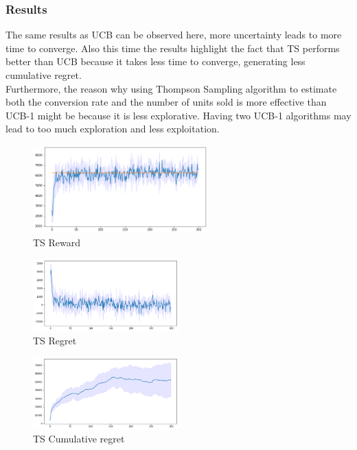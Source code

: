 \subsubsection{Results}
The same results as UCB can be observed here, more uncertainty leads to more time to converge. Also this time the results highlight the fact that TS performs better than UCB because it takes less time to converge, generating less cumulative regret.\\ Furthermore, the reason why using Thompson Sampling algorithm to estimate both the conversion rate and the number of units sold is more effective than UCB-1 might be because it is less explorative. Having two UCB-1 algorithms may lead to too much exploration and less exploitation.
\begin{figure}[ht]
    \begin{center}
    \includegraphics[width=0.6\textwidth]{img/TS4.png}
    \caption{TS Reward}
    \label{fig:reward42}
    \end{center}
\end{figure}
\begin{multicols}{2}
    \begin{figure}[H]
        \begin{center}
        \includegraphics[width=0.5\textwidth]{img/TS4_regret.png}
        \caption{TS Regret}
        \label{fig:regret42}
        \end{center}
    \end{figure}
    \columnbreak
    \begin{figure}[H]
        \begin{center}
        \includegraphics[width=0.5\textwidth]{img/TS4_cum_reg.png}
        \caption{TS Cumulative regret}
        \label{fig:cum_reg42}
        \end{center}
    \end{figure}
\end{multicols}